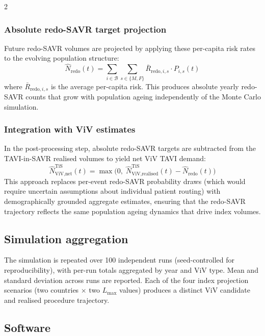 \documentclass[10pt, a4paper]{article}
\begin{document}
\begin{multicols}{2}
\subsubsection{Absolute redo-SAVR target projection}

Future redo-SAVR volumes are projected by applying these per-capita risk rates to the evolving population structure:
%
\begin{equation}
\hat{N}_{\text{redo}}(t) = \sum_{i \in \mathcal{B}} \sum_{s \in \{M,F\}} \bar{R}_{\text{redo},i,s} \cdot P_{i,s}(t)
\end{equation}
%
where $\bar{R}_{\text{redo},i,s}$ is the average per-capita risk. This produces absolute yearly redo-SAVR counts that grow with population ageing independently of the Monte Carlo simulation.

\subsubsection{Integration with ViV estimates}

In the post-processing step, absolute redo-SAVR targets are subtracted from the TAVI-in-SAVR realised volumes to yield net ViV TAVI demand:
%
\begin{equation}
\hat{N}_{\text{ViV,net}}^{\text{TiS}}(t) = \max\!\bigl(0,\; \hat{N}_{\text{ViV,realised}}^{\text{TiS}}(t) - \hat{N}_{\text{redo}}(t)\bigr)
\end{equation}
%
This approach replaces per-event redo-SAVR probability draws (which would require uncertain assumptions about individual patient routing) with demographically grounded aggregate estimates, ensuring that the redo-SAVR trajectory reflects the same population ageing dynamics that drive index volumes.

\subsection{Simulation aggregation}

The simulation is repeated over 100 independent runs (seed-controlled for reproducibility), with per-run totals aggregated by year and ViV type. Mean and standard deviation across runs are reported. Each of the four index projection scenarios (two countries $\times$ two $L_{\max}$ values) produces a distinct ViV candidate and realised procedure trajectory.

\subsection{Software}


\end{multicols}
\end{document}
